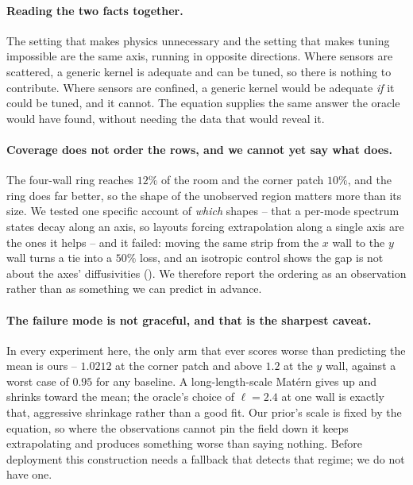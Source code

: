 

\paragraph{Reading the two facts together.}
The setting that makes physics unnecessary and the setting that makes tuning
impossible are the same axis, running in opposite directions.  Where sensors are
scattered, a generic kernel is adequate and can be tuned, so there is nothing to
contribute.  Where sensors are confined, a generic kernel would be adequate
\emph{if} it could be tuned, and it cannot.  The equation supplies the same
answer the oracle would have found, without needing the data that would reveal
it.

\paragraph{Coverage does not order the rows, and we cannot yet say what does.}
The four-wall ring reaches $12\%$ of the room and the corner patch $10\%$, and the
ring does far better, so the shape of the unobserved region matters more than its
size.  We tested one specific account of \emph{which} shapes -- that a per-mode
spectrum states decay along an axis, so layouts forcing extrapolation along a
single axis are the ones it helps -- and it failed: moving the same strip from
the $x$ wall to the $y$ wall turns a tie into a $50\%$ loss, and an isotropic
control shows the gap is not about the axes' diffusivities
().  We therefore report the ordering as an observation
rather than as something we can predict in advance.

\paragraph{The failure mode is not graceful, and that is the sharpest caveat.}
In every experiment here, the only arm that ever scores worse than predicting the
mean is ours -- $1.0212$ at the corner patch and above $1.2$ at the $y$ wall,
against a worst case of $0.95$ for any baseline.  A long-length-scale Mat\'ern
gives up and shrinks toward the mean; the oracle's choice of $\ell = 2.4$ at one
wall is exactly that, aggressive shrinkage rather than a good fit.  Our prior's
scale is fixed by the equation, so where the observations cannot pin the field
down it keeps extrapolating and produces something worse than saying nothing.
Before deployment this construction needs a fallback that detects that regime; we
do not have one.

